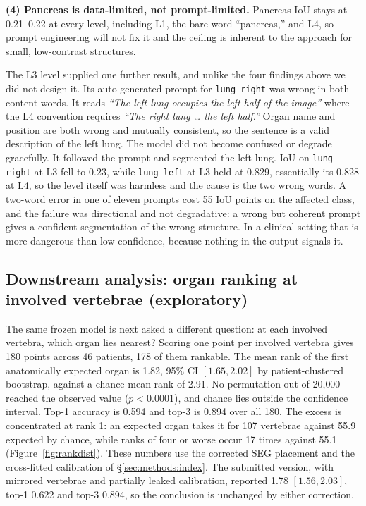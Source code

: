 \documentclass[10pt]{article}
\newcommand{\org}[1]{\texttt{#1}}
\begin{document}
\textbf{(4) Pancreas is data-limited, not prompt-limited.} Pancreas IoU stays at
0.21--0.22 at every level, including L1, the bare word ``pancreas,'' and L4, so
prompt engineering will not fix it and the ceiling is inherent to the approach for
small, low-contrast structures.

The L3 level supplied one further result, and unlike the four findings above we
did not design it. Its auto-generated
prompt for \org{lung-right} was wrong in both content words. It reads \emph{``The
left lung occupies the left half of the image''} where the L4 convention requires
\emph{``The right lung \ldots{} the left half.''} Organ name and position are both
wrong and mutually consistent, so the sentence is a valid description of the left
lung. The model did not become confused or degrade gracefully. It followed the
prompt and segmented the left lung. IoU on \org{lung-right} at L3 fell to 0.23,
while \org{lung-left} at L3 held at 0.829, essentially its 0.828 at L4, so the
level itself was harmless and the cause is the two wrong words. A two-word error
in one of eleven prompts cost 55 IoU points on the affected class, and the failure
was directional and not degradative: a wrong but coherent prompt gives a confident
segmentation of the wrong structure. In a clinical setting that is more dangerous
than low confidence, because nothing in the output signals it.

\subsection{Downstream analysis: organ ranking at involved vertebrae (exploratory)}
\label{sec:results:index}

The same frozen model is next asked a different question: at each involved
vertebra, which organ lies nearest? Scoring one point per involved vertebra gives
180 points across 46 patients, 178 of them rankable. The mean rank of the first
anatomically expected organ is 1.82, 95\% CI $[1.65, 2.02]$ by patient-clustered
bootstrap, against a chance mean rank of 2.91. No permutation out of 20{,}000
reached the observed value ($p<0.0001$), and chance lies outside the confidence
interval. Top-1 accuracy is 0.594 and top-3 is 0.894 over all 180. The excess is
concentrated at rank 1: an expected organ takes it for 107 vertebrae against
55.9 expected by chance, while ranks of four or worse occur 17 times against 55.1
(Figure~\ref{fig:rankdist}). These numbers use the corrected SEG placement and the
cross-fitted calibration of \S\ref{sec:methods:index}. The submitted version,
with mirrored vertebrae and partially leaked calibration, reported 1.78
$[1.56, 2.03]$, top-1 0.622 and top-3 0.894, so the conclusion is unchanged by
either correction.
\end{document}
